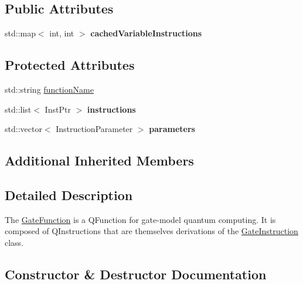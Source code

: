 \subsection*{Public Attributes}
\begin{DoxyCompactItemize}
\item 
std\+::map$<$ int, int $>$ {\bfseries cached\+Variable\+Instructions}\hypertarget{a00032_a3ddfd3bd757fc47544f03e2609d703e0}{}\label{a00032_a3ddfd3bd757fc47544f03e2609d703e0}

\end{DoxyCompactItemize}
\subsection*{Protected Attributes}
\begin{DoxyCompactItemize}
\item 
std\+::string \hyperlink{a00032_aea17cb1ca610bb5b8eadb0642c32b937}{function\+Name}
\item 
std\+::list$<$ Inst\+Ptr $>$ {\bfseries instructions}\hypertarget{a00032_aa2334b23541206ed02023ec28f5e4ac7}{}\label{a00032_aa2334b23541206ed02023ec28f5e4ac7}

\item 
std\+::vector$<$ Instruction\+Parameter $>$ {\bfseries parameters}\hypertarget{a00032_a2f53b483afa8d6b357f2550b8f1a3a9c}{}\label{a00032_a2f53b483afa8d6b357f2550b8f1a3a9c}

\end{DoxyCompactItemize}
\subsection*{Additional Inherited Members}


\subsection{Detailed Description}
The \hyperlink{a00032}{Gate\+Function} is a Q\+Function for gate-\/model quantum computing. It is composed of Q\+Instructions that are themselves derivations of the \hyperlink{a00033}{Gate\+Instruction} class. 

\subsection{Constructor \& Destructor Documentation}
